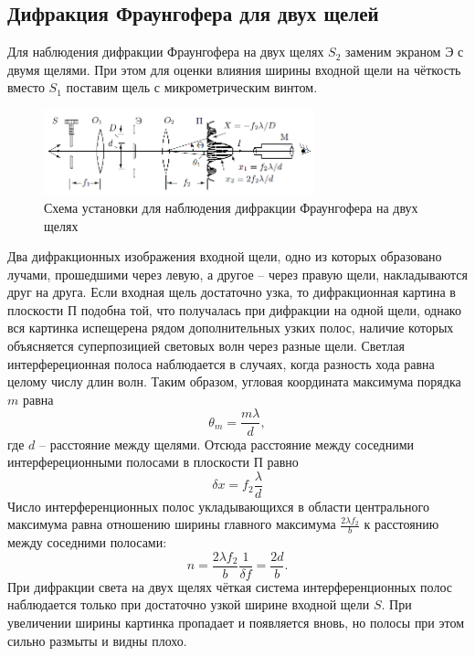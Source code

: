 \documentclass[a4paper, 12pt]{article}
\begin{document}
	\subsection{Дифракция Фраунгофера для двух щелей}
	Для наблюдения дифракции Фраунгофера на двух щелях $S_2$ заменим экраном Э с двумя щелями. При этом для оценки влияния ширины входной щели на чёткость вместо $S_1$ поставим щель с микрометрическим винтом.
	\begin{figure}[h]
		\includegraphics[width = 0.7\textwidth]{431-5.png}
		\centering
		\caption{Схема установки для наблюдения дифракции Фраунгофера на двух щелях}
	\end{figure}
	Два дифракционных изображения входной щели, одно из которых образовано лучами, прошедшими через левую, а другое -- через правую щели, накладываются друг на друга.
	Если входная щель достаточно узка, то дифракционная картина в плоскости П подобна той, что получалась при дифракции на одной щели, однако вся картинка испещерена рядом дополнительных узких полос, наличие которых объясняется суперпозицией световых волн через разные щели. Светлая интерфереционная полоса наблюдается в случаях, когда разность хода равна целому числу длин волн. Таким образом, угловая координата максимума порядка $m$ равна
	\begin{equation}
	\theta_m = \dfrac{m \lambda}{d},
	\end{equation}
	где $d$ -- расстояние между щелями. Отсюда расстояние между соседними интерфереционными полосами в плоскости П равно
	\begin{equation}
	\delta x = f_2 \dfrac{\lambda}{d}
	\end{equation}
	Число интерференционных полос укладывающихся в области центрального максимума равна отношению ширины главного максимума $\frac{2\lambda f_2}{b}$ к расстоянию между соседними полосами:
	\begin{equation}
	n = \dfrac{2\lambda f_2}{b} \dfrac{1}{\delta f}= \dfrac{2d}{b}.
	\end{equation}
	При дифракции света на двух щелях чёткая система интерференционных полос наблюдается только при достаточно узкой ширине входной щели $S$. При увеличении ширины картинка пропадает и появляется вновь, но полосы при этом сильно размыты и видны плохо.
\end{document}
